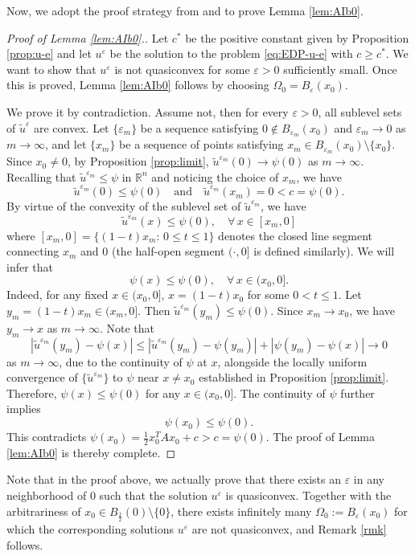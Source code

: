 \documentclass[reqno]{amsart}
\theoremstyle{remark}
\theoremstyle{definition}
\numberwithin{equation}{section}
\begin{document}
Now, we adopt the proof strategy from \cite{Hamel-N-S} and \cite{Wang-Xiao} to prove Lemma \ref{lem:AIb0}.
\begin{proof}[Proof of Lemma \ref{lem:AIb0}.] 
	Let $c^*$ be the positive constant given by Proposition \ref{prop:u-e} and let $u^\varepsilon$ be the solution to the problem \eqref{eq:EDP-u-e} with $c\geq c^*$. We want to show that  $u^\varepsilon$ is not quasiconvex for some $\varepsilon>0$ sufficiently small. Once this is proved, Lemma \ref{lem:AIb0} follows by choosing $\Omega_0=B_\varepsilon(x_0)$. 

	We prove it by contradiction. Assume not, then for every $\varepsilon>0$, all sublevel sets of $\tilde{u}^\varepsilon$ are convex. Let $\{\varepsilon_m\}$ be a sequence satisfying $0\notin B_{\varepsilon_m}(x_0)$ and $\varepsilon_m\to0$ as $m\to\infty$, and let $\{x_m\}$ be a sequence of points satisfying $x_m\in B_{\varepsilon_m}(x_0)\setminus\{x_0\}$.
	Since $x_0\neq0$, by Proposition \ref{prop:limit}, $\tilde{u}^{\varepsilon_m}(0)\to\psi(0)$ as $m\to\infty$. Recalling that $\tilde{u}^{\varepsilon_m}\leq\psi$ in $\mathbb{R}^n$ and noticing the choice of $x_m$, we have 
	$$\tilde{u}^{\varepsilon_m}(0)\leq\psi(0)\quad\text{and}\quad \tilde{u}^{\varepsilon_m}(x_m)=0<c=\psi(0).$$
	By virtue of the convexity of the sublevel set of $\tilde{u}^{\varepsilon_m}$, we have 
	$$\tilde{u}^{\varepsilon_m}(x)\leq\psi(0),\quad\forall\, x\in[x_m,0]$$
	where $[x_m, 0]= \{ (1-t)x_m:\, 0\leq t\leq 1\}$ denotes the closed line segment connecting $x_m$ and $0$ (the half-open segment $(\cdot, 0]$ is defined similarly).
	We will infer that 
	$$\psi(x)\leq \psi(0),\quad\forall\, x\in(x_0,0].$$ 
	Indeed, for any fixed $x\in(x_0,0]$, $x=(1-t)x_0$ for some $0<t\leq1$. Let $y_m=(1-t)x_m\in
	(x_m,0]$. Then $\tilde{u}^{\varepsilon_m}(y_m)\leq\psi(0)$.  Since $x_m\to x_0$, we have $y_m\to x$ as $m\to\infty$.
	Note that 
	$$|\tilde{u}^{\varepsilon_m}(y_m)-\psi(x)|\leq|\tilde{u}^{\varepsilon_m}(y_m)-\psi(y_m)|+|\psi(y_m)-\psi(x)|\to0$$
	as $m\to\infty$, due to the continuity of $\psi$ at $x$, alongside the locally uniform convergence of $\{\tilde{u}^{\varepsilon_m}\}$ to $\psi$ near $x \neq x_0$ established in Proposition \ref{prop:limit}.
	Therefore, $\psi(x)\leq\psi(0)$ for any $x\in(x_0,0]$.
	The continuity of $\psi$ further implies 
	$$\psi(x_0)\leq \psi(0).$$ 
	This contradicts $\psi(x_0)=\frac{1}{2}x_0^TAx_0+c>c=\psi(0)$. The proof of Lemma \ref{lem:AIb0}   is thereby complete.
\end{proof}
Note that in the proof above, we actually prove that there exists an $\varepsilon$ in any neighborhood of $0$ such that the solution $u^\varepsilon$ is quasiconvex. Together with the arbitrariness of $x_0\in B_{\frac{1}{2}}(0)\setminus\{0\}$, there exists infinitely many $\Omega_0:=B_\varepsilon(x_0)$ for which the corresponding solutions $u^\varepsilon$ are not quasiconvex, and Remark \ref{rmk} follows. 
\end{document}
